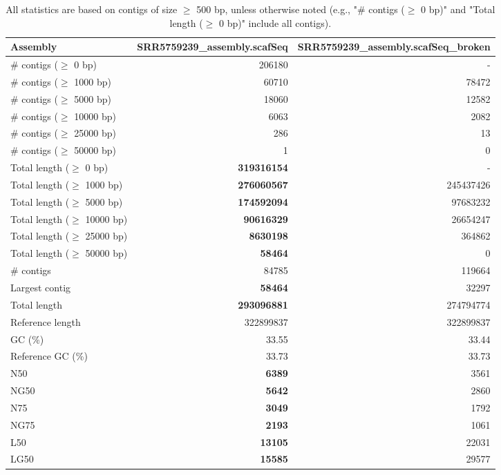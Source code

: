 \documentclass[12pt,a4paper]{article}
\begin{document}
\begin{table}[ht]
\begin{center}
\caption{All statistics are based on contigs of size $\geq$ 500 bp, unless otherwise noted (e.g., "\# contigs ($\geq$ 0 bp)" and "Total length ($\geq$ 0 bp)" include all contigs).}
\begin{tabular}{|l*{2}{|r}|}
\hline
Assembly & SRR5759239\_assembly.scafSeq & SRR5759239\_assembly.scafSeq\_broken \\ \hline
\# contigs ($\geq$ 0 bp) & 206180 & - \\ \hline
\# contigs ($\geq$ 1000 bp) & 60710 & 78472 \\ \hline
\# contigs ($\geq$ 5000 bp) & 18060 & 12582 \\ \hline
\# contigs ($\geq$ 10000 bp) & 6063 & 2082 \\ \hline
\# contigs ($\geq$ 25000 bp) & 286 & 13 \\ \hline
\# contigs ($\geq$ 50000 bp) & 1 & 0 \\ \hline
Total length ($\geq$ 0 bp) & {\bf 319316154} & - \\ \hline
Total length ($\geq$ 1000 bp) & {\bf 276060567} & 245437426 \\ \hline
Total length ($\geq$ 5000 bp) & {\bf 174592094} & 97683232 \\ \hline
Total length ($\geq$ 10000 bp) & {\bf 90616329} & 26654247 \\ \hline
Total length ($\geq$ 25000 bp) & {\bf 8630198} & 364862 \\ \hline
Total length ($\geq$ 50000 bp) & {\bf 58464} & 0 \\ \hline
\# contigs & 84785 & 119664 \\ \hline
Largest contig & {\bf 58464} & 32297 \\ \hline
Total length & {\bf 293096881} & 274794774 \\ \hline
Reference length & 322899837 & 322899837 \\ \hline
GC (\%) & 33.55 & 33.44 \\ \hline
Reference GC (\%) & 33.73 & 33.73 \\ \hline
N50 & {\bf 6389} & 3561 \\ \hline
NG50 & {\bf 5642} & 2860 \\ \hline
N75 & {\bf 3049} & 1792 \\ \hline
NG75 & {\bf 2193} & 1061 \\ \hline
L50 & {\bf 13105} & 22031 \\ \hline
LG50 & {\bf 15585} & 29577 \\ \hline

\end{tabular}
\end{center}
\end{table}
\end{document}
